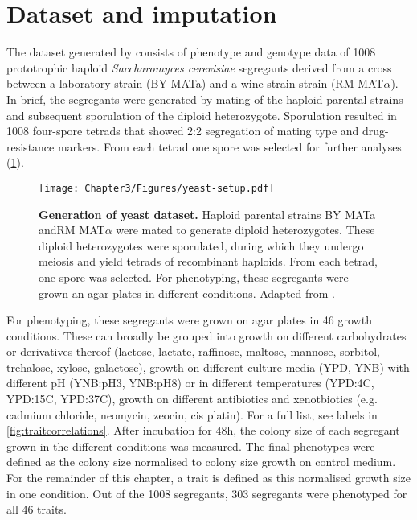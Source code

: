 \section{Dataset and imputation}
The dataset generated by \citet{Bloom2013} consists of phenotype and genotype data of \num{1008} prototrophic haploid \emph{Saccharomyces cerevisiae} segregants derived from a cross between a laboratory strain (BY MATa) and a wine strain strain (RM MAT\(\alpha\)). In brief, the segregants were generated by mating of the haploid parental strains and subsequent sporulation of the diploid heterozygote. Sporulation resulted in  \num{1008} four-spore tetrads that showed 2:2 segregation of mating type and drug-resistance markers. From each tetrad one spore was selected for further analyses (\cref{fig:yeast-setup}).

\begin{figure}[p]
	\centering
	\texttt{[image: Chapter3/Figures/yeast-setup.pdf]}
	\caption[\textbf{Generation of yeast dataset.}]{\textbf{Generation of yeast dataset. } Haploid parental strains BY MATa andRM MAT\(\alpha\)  were mated to generate diploid heterozygotes. These diploid heterozygotes were sporulated, during which they undergo meiosis and yield tetrads of recombinant haploids. From each tetrad, one spore was selected. For phenotyping, these segregants were grown an agar plates in different conditions. Adapted from \citep{Bloom2013}.}
 	\label{fig:yeast-setup}
\end{figure}


For phenotyping, these segregants were grown on agar plates in \num{46} growth conditions. These can broadly be grouped into growth on different carbohydrates or derivatives thereof (lactose, lactate, raffinose, maltose, mannose, sorbitol, trehalose, xylose, galactose), growth on different culture media (YPD, YNB) with different pH (YNB:pH3, YNB:pH8) or in different temperatures (YPD:4C, YPD:15C, YPD:37C), growth on different antibiotics and xenotbiotics (e.g. cadmium chloride, neomycin, zeocin, cis platin). For a full list, see labels in \cref{fig:traitcorrelations}. After incubation for 48h, the colony size of each segregant grown in the different conditions was measured. The final phenotypes were defined as the colony size normalised to colony size growth on control medium. For the remainder of this chapter, a trait is defined as this normalised growth size in one condition. Out of the \num{1008} segregants, \num{303} segregants were phenotyped for all \num{46} traits.

